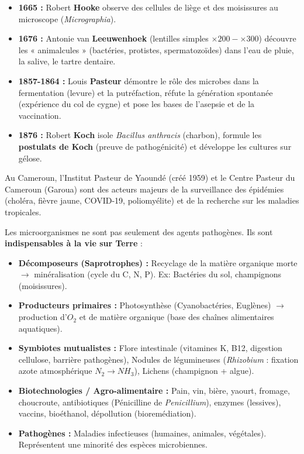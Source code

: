 \documentclass[11pt]{article}
\begin{document}
\begin{savaistu}
    \begin{itemize}
        \item \textbf{1665 :} Robert \textbf{Hooke} observe des cellules de liège et des moisissures au microscope (\emph{Micrographia}).
        \item \textbf{1676 :} Antonie van \textbf{Leeuwenhoek} (lentilles simples $\times 200-\times 300$) découvre les « animalcules » (bactéries, protistes, spermatozoïdes) dans l'eau de pluie, la salive, le tartre dentaire.
        \item \textbf{1857-1864 :} Louis \textbf{Pasteur} démontre le rôle des microbes dans la fermentation (levure) et la putréfaction, réfute la génération spontanée (expérience du col de cygne) et pose les bases de l'asepsie et de la vaccination.
        \item \textbf{1876 :} Robert \textbf{Koch} isole \emph{Bacillus anthracis} (charbon), formule les \textbf{postulats de Koch} (preuve de pathogénicité) et développe les cultures sur gélose.
    \end{itemize}
    Au Cameroun, l'Institut Pasteur de Yaoundé (créé 1959) et le Centre Pasteur du Cameroun (Garoua) sont des acteurs majeurs de la surveillance des épidémies (choléra, fièvre jaune, COVID-19, poliomyélite) et de la recherche sur les maladies tropicales.
\end{savaistu}

\begin{propriete}
    Les microorganismes ne sont pas seulement des agents pathogènes. Ils sont \textbf{indispensables à la vie sur Terre} :
    \begin{itemize}
        \item \textbf{Décomposeurs (Saprotrophes) :} Recyclage de la matière organique morte $\rightarrow$ minéralisation (cycle du C, N, P). Ex: Bactéries du sol, champignons (moisissures).
        \item \textbf{Producteurs primaires :} Photosynthèse (Cyanobactéries, Euglènes) $\rightarrow$ production d'$O_2$ et de matière organique (base des chaînes alimentaires aquatiques).
        \item \textbf{Symbiotes mutualistes :} Flore intestinale (vitamines K, B12, digestion cellulose, barrière pathogènes), Nodules de légumineuses (\emph{Rhizobium} : fixation azote atmosphérique $N_2 \rightarrow NH_3$), Lichens (champignon + algue).
        \item \textbf{Biotechnologies / Agro-alimentaire :} Pain, vin, bière, yaourt, fromage, choucroute, antibiotiques (Pénicilline de \emph{Penicillium}), enzymes (lessives), vaccins, bioéthanol, dépollution (bioremédiation).
        \item \textbf{Pathogènes :} Maladies infectieuses (humaines, animales, végétales). Représentent une minorité des espèces microbiennes.
    \end{itemize}
\end{propriete}
\end{document}
